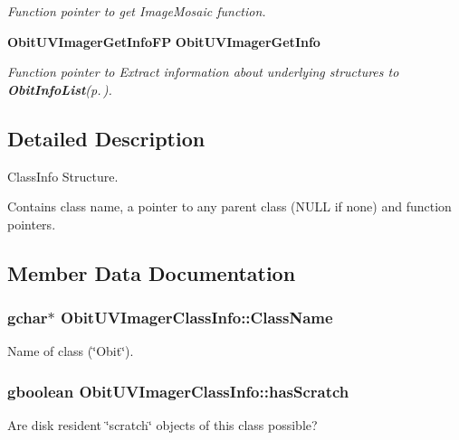 \begin{CompactItemize}
\begin{CompactList}\small\item\em Function pointer to get Image\-Mosaic function. \item\end{CompactList}\item 
{\bf Obit\-UVImager\-Get\-Info\-FP} {\bf Obit\-UVImager\-Get\-Info}
\begin{CompactList}\small\item\em Function pointer to Extract information about underlying structures to {\bf Obit\-Info\-List}{\rm (p.\,\pageref{structObitInfoList})}. \item\end{CompactList}\end{CompactItemize}


\subsection{Detailed Description}
Class\-Info Structure. 

Contains class name, a pointer to any parent class (NULL if none) and function pointers. 



\subsection{Member Data Documentation}
\subsubsection{\setlength{\rightskip}{0pt plus 5cm}gchar$\ast$ {\bf Obit\-UVImager\-Class\-Info::Class\-Name}}\label{structObitUVImagerClassInfo_o2}


Name of class (\char`\"{}Obit\char`\"{}). 

\subsubsection{\setlength{\rightskip}{0pt plus 5cm}gboolean {\bf Obit\-UVImager\-Class\-Info::has\-Scratch}}\label{structObitUVImagerClassInfo_o1}


Are disk resident \char`\"{}scratch\char`\"{} objects of this class possible? 

